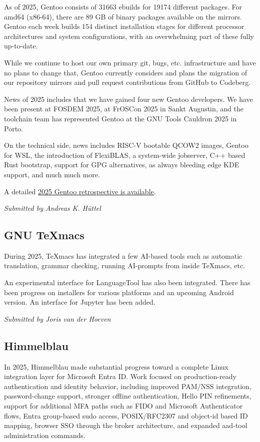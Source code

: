\documentclass[a4paper]{report}
\begin{document}
As of 2025, Gentoo consists of 31663 ebuilds for 19174 different packages. For amd64 (x86-64), there are 89 GB of binary packages available on the mirrors. Gentoo each week builds 154 distinct installation stages for different processor architectures and system configurations, with an overwhelming part of these fully up-to-date.

While we continue to host our own primary git, bugs, etc. infrastructure and have no plans to change that, Gentoo currently considers and plans the migration of our repository mirrors and pull request contributions from GitHub to Codeberg.

News of 2025 includes that we have gained four new Gentoo developers. We have been present at FOSDEM 2025, at FrOSCon 2025 in Sankt Augustin, and the toolchain team has represented Gentoo at the GNU Tools Cauldron 2025 in Porto.

On the technical side, news includes RISC-V bootable QCOW2 images, Gentoo for WSL, the introduction of FlexiBLAS, a system-wide jobserver, C++ based Rust bootstrap, support for GPG alternatives, as always bleeding edge KDE support, and much much more.

A detailed \href{https://www.gentoo.org/news/2026/01/05/new-year.html}{2025 Gentoo retrospective is available}.

{\em Submitted by Andreas K. Hüttel}

\subsection{GNU TeXmacs}

During 2025, TeXmacs has integrated a few AI-based tools such as automatic translation, grammar checking, running AI-prompts from inside TeXmacs, etc.

An experimental interface for LanguageTool has also been integrated. There has been progress on installers for various platforms and an upcoming Android version. An interface for Jupyter has been added.

{\em Submitted by Joris van der Hoeven}

\subsection{Himmelblau}

In 2025, Himmelblau made substantial progress toward a complete Linux integration layer for Microsoft Entra ID. Work focused on production-ready authentication and identity behavior, including improved PAM/NSS integration, password-change support, stronger offline authentication, Hello PIN refinements, support for additional MFA paths such as FIDO and Microsoft Authenticator flows, Entra group-based sudo access, POSIX/RFC2307 and object-id based ID mapping, browser SSO through the broker architecture, and expanded aad-tool administration commands.
\end{document}

